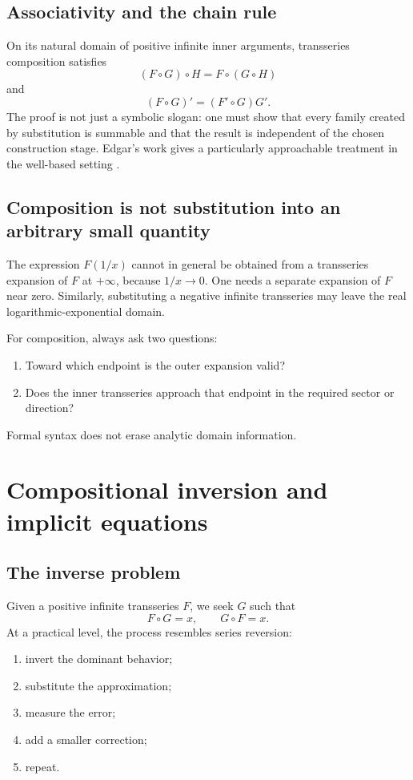 \documentclass[11pt,openany]{book}
\theoremstyle{plain}
\theoremstyle{definition}
\theoremstyle{remark}
\begin{document}
\section{Associativity and the chain rule}
On its natural domain of positive infinite inner arguments, transseries composition satisfies
\[
  (F\circ G)\circ H=F\circ(G\circ H)
\]
and
\[
  (F\circ G)'=(F'\circ G)G'.
\]
The proof is not just a symbolic slogan: one must show that every family created by substitution is summable and that the result is independent of the chosen construction stage. Edgar's work gives a particularly approachable treatment in the well-based setting \cite{EdgarComposition}.

\section{Composition is not substitution into an arbitrary small quantity}
The expression $F(1/x)$ cannot in general be obtained from a transseries expansion of $F$ at $+\infty$, because $1/x\to0$. One needs a separate expansion of $F$ near zero. Similarly, substituting a negative infinite transseries may leave the real logarithmic-exponential domain.

\begin{checkpointbox}
For composition, always ask two questions:
\begin{enumerate}
\item Toward which endpoint is the outer expansion valid?
\item Does the inner transseries approach that endpoint in the required sector or direction?
\end{enumerate}
Formal syntax does not erase analytic domain information.
\end{checkpointbox}

\chapter{Compositional inversion and implicit equations}
\label{chap:inverse}

\section{The inverse problem}
Given a positive infinite transseries $F$, we seek $G$ such that
\[
  F\circ G=x,
  \qquad
  G\circ F=x.
\]
At a practical level, the process resembles series reversion:
\begin{enumerate}
\item invert the dominant behavior;
\item substitute the approximation;
\item measure the error;
\item add a smaller correction;
\item repeat.
\end{enumerate}
\end{document}
